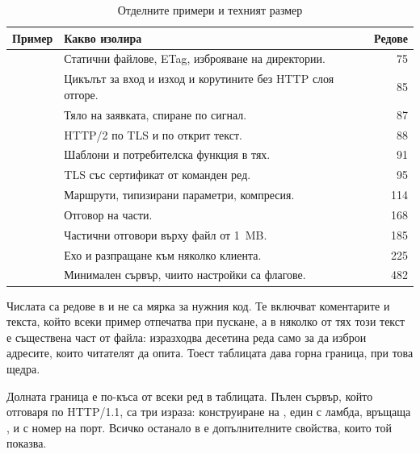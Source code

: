 \begin{table}[H]
\centering
\caption{Отделните примери и техният размер}
\label{tab:samples}
\begin{tabular}{@{}L{3.7cm}L{7.9cm}r@{}}
\toprule
\textbf{Пример} & \textbf{Какво изолира} & \textbf{Редове} \\
\midrule
{}    & Статични файлове, ETag, изброяване на директории. & 75 \\
    & Цикълът за вход и изход и корутините без HTTP слоя отгоре. & 85 \\
      & Тяло на заявката, спиране по сигнал. & 87 \\
     & HTTP/2 по TLS и по открит текст. & 88 \\
  & Шаблони и потребителска функция в тях. & 91 \\
     & TLS със сертификат от команден ред. & 95 \\
      & Маршрути, типизирани параметри, компресия. & 114 \\
 & Отговор на части. & 168 \\
     & Частични отговори върху файл от 1~MB. & 185 \\
 & Ехо и разпращане към няколко клиента. & 225 \\
 & Минимален сървър, чиито настройки са флагове. & 482 \\
\bottomrule
\end{tabular}
\end{table}

Числата са редове в  и не са мярка за нужния код. Те включват коментарите и
текста, който всеки пример отпечатва при пускане, а в няколко от тях този текст е
съществена част от файла:  изразходва десетина реда само за да
изброи адресите, които читателят да опита. Тоест таблицата дава горна граница, при това
щедра.

Долната граница е по-къса от всеки ред в таблицата. Пълен сървър, който отговаря по
HTTP/1.1, са три израза: конструиране на , един  с ламбда, връщаща
, и  с номер на порт. Всичко останало в
 е допълнителните свойства, които той показва.

